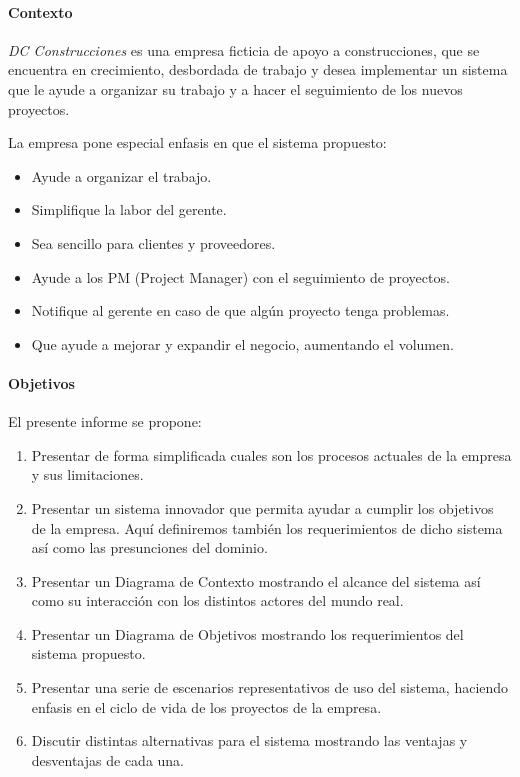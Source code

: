 \paragraph{Contexto}
\textit{DC Construcciones} es una empresa ficticia de apoyo a construcciones,
que se encuentra en crecimiento, desbordada de trabajo y desea implementar un
sistema que le ayude a organizar su trabajo y a hacer el seguimiento de los nuevos proyectos.

La empresa pone especial enfasis en que el sistema propuesto:

\begin{itemize}
    \item Ayude a organizar el trabajo.
    \item Simplifique la labor del gerente.
    \item Sea sencillo para clientes y proveedores.
    \item Ayude a los PM (Project Manager) con el seguimiento de proyectos.
    \item Notifique al gerente en caso de que algún proyecto tenga problemas.
    \item Que ayude a mejorar y expandir el negocio, aumentando el volumen.
\end{itemize}

\paragraph{Objetivos}
El presente informe se propone:

\begin{enumerate}
    \item Presentar de forma simplificada cuales son los procesos actuales de la empresa y sus limitaciones.
    \item Presentar un sistema innovador que permita ayudar a cumplir los objetivos de la empresa.
        Aquí definiremos también los requerimientos de dicho sistema así como las presunciones del dominio.
    \item Presentar un Diagrama de Contexto mostrando el alcance del sistema así como su interacción con los distintos actores del mundo real.
    \item Presentar un Diagrama de Objetivos mostrando los requerimientos del sistema propuesto.
    \item Presentar una serie de escenarios representativos de uso del sistema, haciendo enfasis en el ciclo de vida de los proyectos de la empresa.
    \item Discutir distintas alternativas para el sistema mostrando las ventajas y desventajas de cada una.
\end{enumerate}


